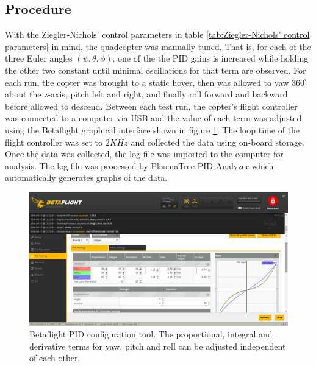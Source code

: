 \documentclass[11pt]{ucthesis}
\begin{document}
\subsection{Procedure}
With the Ziegler-Nichols’ control parameters in table \ref{tab:Ziegler-Nichols’ control parameters} in mind, the quadcopter was manually tuned. That is, for each of the three Euler angles $(\psi,\theta,\phi)$, one of the the PID gains is increased while holding the other two constant until minimal oscillations for that term are observed. For each run, the copter was brought to a static hover, then was allowed to yaw $360^\circ$ about the z-axis, pitch left and right, and finally roll forward and backward before allowed to descend. Between each test run, the copter's flight controller was connected to a computer via USB and the value of each term was adjusted using the Betaflight graphical interface shown in figure \ref{fig:pidSample}. The loop time of the flight controller was set to $2KHz$ and collected the data using on-board storage. Once the data was collected, the log file was imported to the computer for analysis. The log file was processed by PlasmaTree PID Analyzer which automatically generates graphs of the data.
\begin{figure}[H]
	\centering
	\includegraphics[width=\textwidth,height=\textheight,keepaspectratio]{pidSample}
	\caption[Betaflight PID configuration tool.]{Betaflight PID configuration tool. The proportional, integral and derivative terms for yaw, pitch and roll can be adjusted independent of each other. \cite{Betaflight}}
	\label{fig:pidSample}
\end{figure}
\end{document}
